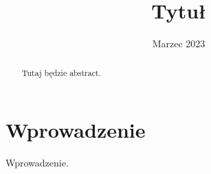 \documentclass{pracamgr}
\title{Tytuł}
\date{Marzec 2023}
\begin{document}
\maketitle

\begin{abstract}
    Tutaj będzie abstract.
\end{abstract}

\tableofcontents

\chapter*{Wprowadzenie}

    Wprowadzenie.


\begin{thebibliography}{99}

\end{thebibliography}
\end{document}
